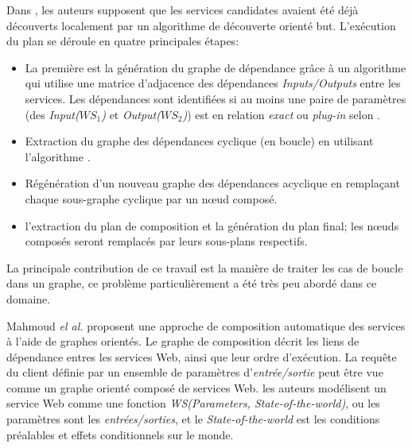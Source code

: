   Dans \cite{omer2009dependency}, les auteurs supposent que les
  services candidates avaient été déjà découverts localement par un
  algorithme de découverte orienté but. L'exécution du plan se déroule
  en quatre principales étapes:

  \SpecialItem
  \begin{itemize}
  \item La première est la génération du graphe de dépendance grâce à
    un algorithme qui utilise une matrice d'adjacence des dépendances
    \textit{Inputs/Outputs} entre les services. Les dépendances sont
    identifiées si au moins une paire de paramètres (des
    \textit{Input($WS_1$)} et \textit{Output($WS_2$)}) est en
    relation \textit{exact} ou \textit{plug-in} selon
    \cite{paolucci2002semantic}.

  \item Extraction du graphe des dépendances cyclique (en boucle) en
    utilisant l'algorithme \cite{tarjan1973enumeration}.

  \item Régénération d'un nouveau graphe des dépendances acyclique en
    remplaçant chaque sous-graphe cyclique par un nœud composé.

  \item l'extraction du plan de composition et la génération du plan
    final; les nœuds composés seront remplacés par leurs sous-plans
    respectifs.\medskip
  \end{itemize}
  \enddescription

  La principale contribution de ce travail est la manière de traiter
  les cas de boucle dans un graphe, ce problème particulièrement a été
  très peu abordé dans ce domaine.\bigskip

  Mahmoud \emph{el al.} \cite{mahmoud2013towards} proposent une
  approche de composition automatique des services à l'aide de graphes
  orientés. Le graphe de composition décrit les liens de dépendance
  entres les services Web, ainsi que leur ordre d'exécution. La requête
  du client définie par un ensemble de paramètres
  d'\textit{entrée/sortie} peut être vue comme un graphe orienté
  composé de services Web. les auteurs modélisent un service Web comme
  une fonction \textit{WS(Parameters, State-of-the-world)}, ou les
  paramètres sont les \textit{entrées/sorties}, et le
  \textit{State-of-the-world} est les conditions préalables et effets
  conditionnels sur le monde.

